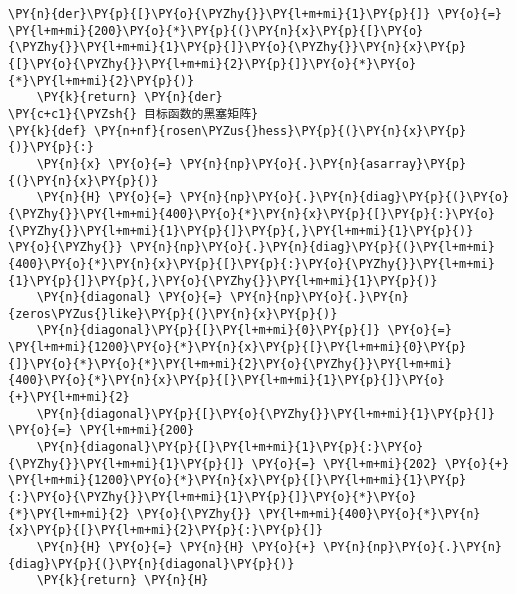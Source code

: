 \begin{tcolorbox}[breakable, size=fbox, boxrule=1pt, pad at break*=1mm,colback=cellbackground, colframe=cellborder]
\begin{Verbatim}[commandchars=\\\{\}]
    \PY{n}{der}\PY{p}{[}\PY{o}{\PYZhy{}}\PY{l+m+mi}{1}\PY{p}{]} \PY{o}{=} \PY{l+m+mi}{200}\PY{o}{*}\PY{p}{(}\PY{n}{x}\PY{p}{[}\PY{o}{\PYZhy{}}\PY{l+m+mi}{1}\PY{p}{]}\PY{o}{\PYZhy{}}\PY{n}{x}\PY{p}{[}\PY{o}{\PYZhy{}}\PY{l+m+mi}{2}\PY{p}{]}\PY{o}{*}\PY{o}{*}\PY{l+m+mi}{2}\PY{p}{)}
    \PY{k}{return} \PY{n}{der}
\PY{c+c1}{\PYZsh{} 目标函数的黑塞矩阵}
\PY{k}{def} \PY{n+nf}{rosen\PYZus{}hess}\PY{p}{(}\PY{n}{x}\PY{p}{)}\PY{p}{:}
    \PY{n}{x} \PY{o}{=} \PY{n}{np}\PY{o}{.}\PY{n}{asarray}\PY{p}{(}\PY{n}{x}\PY{p}{)}
    \PY{n}{H} \PY{o}{=} \PY{n}{np}\PY{o}{.}\PY{n}{diag}\PY{p}{(}\PY{o}{\PYZhy{}}\PY{l+m+mi}{400}\PY{o}{*}\PY{n}{x}\PY{p}{[}\PY{p}{:}\PY{o}{\PYZhy{}}\PY{l+m+mi}{1}\PY{p}{]}\PY{p}{,}\PY{l+m+mi}{1}\PY{p}{)} \PY{o}{\PYZhy{}} \PY{n}{np}\PY{o}{.}\PY{n}{diag}\PY{p}{(}\PY{l+m+mi}{400}\PY{o}{*}\PY{n}{x}\PY{p}{[}\PY{p}{:}\PY{o}{\PYZhy{}}\PY{l+m+mi}{1}\PY{p}{]}\PY{p}{,}\PY{o}{\PYZhy{}}\PY{l+m+mi}{1}\PY{p}{)}
    \PY{n}{diagonal} \PY{o}{=} \PY{n}{np}\PY{o}{.}\PY{n}{zeros\PYZus{}like}\PY{p}{(}\PY{n}{x}\PY{p}{)}
    \PY{n}{diagonal}\PY{p}{[}\PY{l+m+mi}{0}\PY{p}{]} \PY{o}{=} \PY{l+m+mi}{1200}\PY{o}{*}\PY{n}{x}\PY{p}{[}\PY{l+m+mi}{0}\PY{p}{]}\PY{o}{*}\PY{o}{*}\PY{l+m+mi}{2}\PY{o}{\PYZhy{}}\PY{l+m+mi}{400}\PY{o}{*}\PY{n}{x}\PY{p}{[}\PY{l+m+mi}{1}\PY{p}{]}\PY{o}{+}\PY{l+m+mi}{2}
    \PY{n}{diagonal}\PY{p}{[}\PY{o}{\PYZhy{}}\PY{l+m+mi}{1}\PY{p}{]} \PY{o}{=} \PY{l+m+mi}{200}
    \PY{n}{diagonal}\PY{p}{[}\PY{l+m+mi}{1}\PY{p}{:}\PY{o}{\PYZhy{}}\PY{l+m+mi}{1}\PY{p}{]} \PY{o}{=} \PY{l+m+mi}{202} \PY{o}{+} \PY{l+m+mi}{1200}\PY{o}{*}\PY{n}{x}\PY{p}{[}\PY{l+m+mi}{1}\PY{p}{:}\PY{o}{\PYZhy{}}\PY{l+m+mi}{1}\PY{p}{]}\PY{o}{*}\PY{o}{*}\PY{l+m+mi}{2} \PY{o}{\PYZhy{}} \PY{l+m+mi}{400}\PY{o}{*}\PY{n}{x}\PY{p}{[}\PY{l+m+mi}{2}\PY{p}{:}\PY{p}{]}
    \PY{n}{H} \PY{o}{=} \PY{n}{H} \PY{o}{+} \PY{n}{np}\PY{o}{.}\PY{n}{diag}\PY{p}{(}\PY{n}{diagonal}\PY{p}{)}
    \PY{k}{return} \PY{n}{H}
\end{Verbatim}
\end{tcolorbox}

